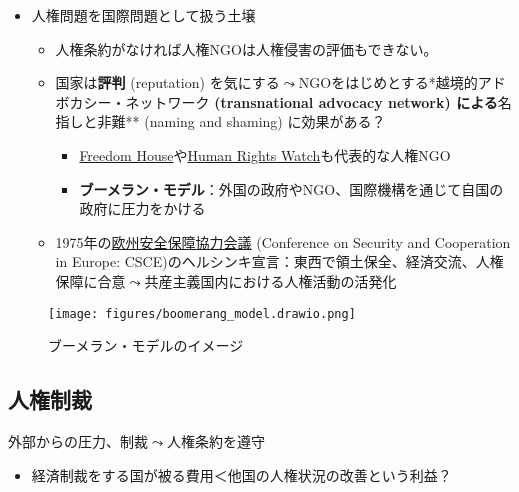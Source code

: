 \documentclass[
  xelatex,
  ja=standard]{bxjsarticle}
\providecommand{\tightlist}{%
  \setlength{\itemsep}{0pt}\setlength{\parskip}{0pt}}\usepackage{longtable,booktabs,array}
\begin{document}
\begin{itemize}
\tightlist
\item
  人権問題を国際問題として扱う土壌

  \begin{itemize}
  \tightlist
  \item
    人権条約がなければ人権NGOは人権侵害の評価もできない。
  \item
    国家は\textbf{評判} (reputation)
    を気にする\(\leadsto\)NGOをはじめとする*越境的アドボカシー・ネットワーク\textbf{
    (transnational advocacy network) による}名指しと非難** (naming and
    shaming) に効果がある？\citep{hafner2008}

    \begin{itemize}
    \tightlist
    \item
      \href{https://freedomhouse.org/}{Freedom
      House}や\href{https://www.hrw.org/ja}{Human Rights
      Watch}も代表的な人権NGO
    \item
      \textbf{ブーメラン・モデル}：外国の政府やNGO、国際機構を通じて自国の政府に圧力をかける\citep{keck1999}
    \end{itemize}
  \item
    1975年の\href{https://www.mofa.go.jp/mofaj/area/osce/gaiyo.html}{欧州安全保障協力会議}
    (Conference on Security and Cooperation in Europe:
    CSCE)のヘルシンキ宣言：東西で領土保全、経済交流、人権保障に合意\(\leadsto\)共産主義国内における人権活動の活発化
  \end{itemize}
\end{itemize}

\begin{figure}[htpb]

{\centering \texttt{[image: figures/boomerang\_model.drawio.png]}

}

\caption{ブーメラン・モデルのイメージ}

\end{figure}

\hypertarget{ux4ebaux6a29ux5236ux88c1}{%
\subsection{人権制裁}\label{ux4ebaux6a29ux5236ux88c1}}

外部からの圧力、制裁\(\leadsto\)人権条約を遵守

\begin{itemize}
\tightlist
\item
  経済制裁をする国が被る費用＜他国の人権状況の改善という利益？
\end{itemize}
\end{document}

